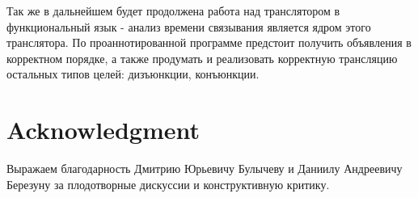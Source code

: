 \documentclass[conference]{IEEEtran}
\begin{document}
Так же в дальнейшем будет продолжена работа над транслятором в функциональный язык - анализ времени связывания является ядром этого транслятора. По проаннотированной программе предстоит получить объявления в корректном порядке, а также продумать и реализовать корректную трансляцию остальных типов целей: дизъюнкции, конъюнкции.

\section*{Acknowledgment}

Выражаем благодарность Дмитрию Юрьевичу Булычеву и Даниилу Андреевичу Березуну за плодотворные дискуссии и конструктивную критику.



\end{document}
